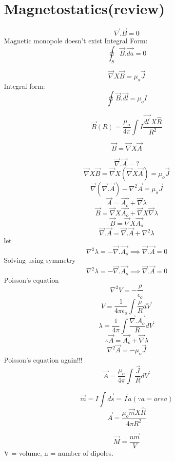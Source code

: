 \section{Magnetostatics(review)}
\begin{definition}
    \[
        \vec{\nabla}.\vec{B} = 0 
    \]
    Magnetic monopole doesn't exist
    Integral Form:
    \[
        \oint_S \vec{B}.\vec{da}=0
    \]
\end{definition}
\begin{definition}
    \[
        \vec{\nabla}X\vec{B} = \mu_o \vec{J}
    \]
    Integral form:
    \[
        \oint \vec{B}.\vec{dl} = \mu_{o} I
    \]
\end{definition}
\begin{definition}
    \[
        \vec{B}(R) = \frac{\mu_{o} }{4 \pi}\int I \frac{\vec{dl^\prime} X \hat{R}}{R^2}
    \]
\end{definition}
\begin{definition}
    \[
        \vec{B} = \vec{\nabla}X\vec{A}
    \]
\end{definition}
\[
    \vec{\nabla}.\vec{A} = ?
\]
\[
    \vec{\nabla}X\vec{B} = \vec{\nabla}X(\vec{\nabla}X\vec{A}) = \mu_o \vec{J}
\]
\[
  \vec{\nabla}(\vec{\nabla}.\vec{A})  - \nabla^2 \vec{A} = \mu_o \vec{J}
\]
\[
    \vec{A} = \vec{A_{o} }+\vec{\nabla}\lambda
\]
\[
    \vec{B} = \vec{\nabla}X\vec{A_o}+\vec{\nabla}X\vec{\nabla}\lambda
\]
\[
    \vec{B} = \vec{\nabla}X\vec{A_{o}}
\]
\[
    \vec{\nabla}.\vec{A} = \vec{\nabla}.\vec{A} + \nabla^2 \lambda
\]
let 
\[
    \nabla ^2 \lambda = -\vec{\nabla}.\vec{A_o} \implies \vec{\nabla}.\vec{A} = 0
\]
Solving using symmetry 
\[
    \nabla^{2} \lambda = -\vec{\nabla}.\vec{A_{o} } \implies \vec{\nabla}.\vec{A} = 0
\]
Poisson's equation
\[
    \nabla^2 V = -\frac{\rho}{\epsilon_{o}}
\]
\[
    V = \frac{1}{4\pi\epsilon_{o} }\int \frac{\rho}{R}dV^\prime 
\]
\[
    \lambda = \frac{1}{4 \pi} \int \frac{\vec{\nabla}.\vec{A_{o}}}{R}dV^\prime 
\]
\[
    \therefore \vec{A} = \vec{A_{o} }+ \vec{\nabla}\lambda
\]
\[
    \nabla^2 \vec{A} = - \mu_{o} \vec{J}
\]Poisson's equation again!!!
\[
    \vec{A} = \frac{\mu_{o} }{4\pi} \int \frac{\vec{J}}{R}dV^\prime 
\]
\begin{definition}
\[
    \vec{m} = I \int \vec{ds} = \vec{I} a (\because a = area)
\]
\[
    \vec{A} = \frac{\mu_{o} \vec{m} X \hat{R}}{4 \pi R^2}
\]
\end{definition}
\begin{definition}
    \[
        \vec{M} = \frac{n \vec{m}}{V}
    \] V = volume, n = number of dipoles.
\end{definition}

